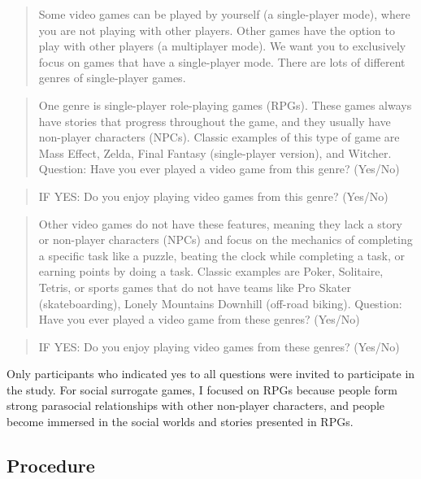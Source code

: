 \documentclass[
]{udthesis}
\begin{document}
\begin{quote}
Some video games can be played by yourself (a single-player mode), where you are not playing with other players. Other games have the option to play with other players (a multiplayer mode). We want you to exclusively focus on games that have a single-player mode. There are lots of different genres of single-player games.
\end{quote}

\begin{quote}
One genre is single-player role-playing games (RPGs). These games always have stories that progress throughout the game, and they usually have non-player characters (NPCs). Classic examples of this type of game are Mass Effect, Zelda, Final Fantasy (single-player version), and Witcher. Question: Have you ever played a video game from this genre? (Yes/No)
\end{quote}

\begin{quote}
IF YES: Do you enjoy playing video games from this genre? (Yes/No)
\end{quote}

\begin{quote}
Other video games do not have these features, meaning they lack a story or non-player characters (NPCs) and focus on the mechanics of completing a specific task like a puzzle, beating the clock while completing a task, or earning points by doing a task. Classic examples are Poker, Solitaire, Tetris, or sports games that do not have teams like Pro Skater (skateboarding), Lonely Mountains Downhill (off-road biking). Question: Have you ever played a video game from these genres? (Yes/No)
\end{quote}

\begin{quote}
IF YES: Do you enjoy playing video games from these genres? (Yes/No)
\end{quote}

Only participants who indicated yes to all questions were invited to participate in the study. For social surrogate games, I focused on RPGs because people form strong parasocial relationships with other non-player characters, and people become immersed in the social worlds and stories presented in RPGs.

\subsection{Procedure}\label{procedure}
\end{document}
